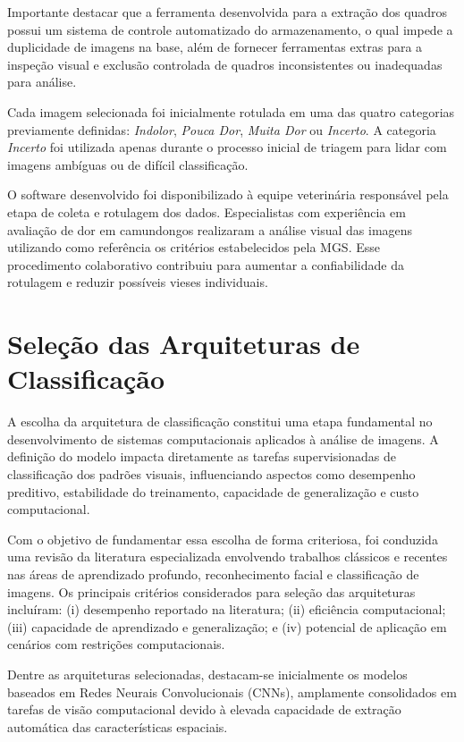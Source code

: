 Importante destacar que a ferramenta desenvolvida para a extração dos quadros possui um sistema de controle automatizado do armazenamento, o qual impede a duplicidade de imagens na base, além de fornecer ferramentas extras para a inspeção visual e exclusão controlada de quadros inconsistentes ou inadequadas para análise.

Cada imagem selecionada foi inicialmente rotulada em uma das quatro categorias previamente definidas: \textit{Indolor}, \textit{Pouca Dor}, \textit{Muita Dor} ou \textit{Incerto}. A categoria \textit{Incerto} foi utilizada apenas durante o processo inicial de triagem para lidar com imagens ambíguas ou de difícil classificação. 

O software desenvolvido foi disponibilizado à equipe veterinária responsável pela etapa de coleta e rotulagem dos dados. Especialistas com experiência em avaliação de dor em camundongos realizaram a análise visual das imagens utilizando como referência os critérios estabelecidos pela \acs{MGS}. Esse procedimento colaborativo contribuiu para aumentar a confiabilidade da rotulagem e reduzir possíveis vieses individuais.

\section{Seleção das Arquiteturas de Classificação}

A escolha da arquitetura de classificação constitui uma etapa fundamental no desenvolvimento de sistemas computacionais aplicados à análise de imagens. A definição do modelo impacta diretamente as tarefas supervisionadas de classificação dos padrões visuais, influenciando aspectos como desempenho preditivo, estabilidade do treinamento, capacidade de generalização e custo computacional.

Com o objetivo de fundamentar essa escolha de forma criteriosa, foi conduzida uma revisão da literatura especializada envolvendo trabalhos clássicos e recentes nas áreas de aprendizado profundo, reconhecimento facial e classificação de imagens. Os principais critérios considerados para seleção das arquiteturas incluíram: (i) desempenho reportado na literatura; (ii) eficiência computacional; (iii) capacidade de aprendizado e generalização; e (iv) potencial de aplicação em cenários com restrições computacionais.

Dentre as arquiteturas selecionadas, destacam-se inicialmente os modelos baseados em Redes Neurais Convolucionais (\acsp{CNN}), amplamente consolidados em tarefas de visão computacional devido à elevada capacidade de extração automática das características espaciais.

